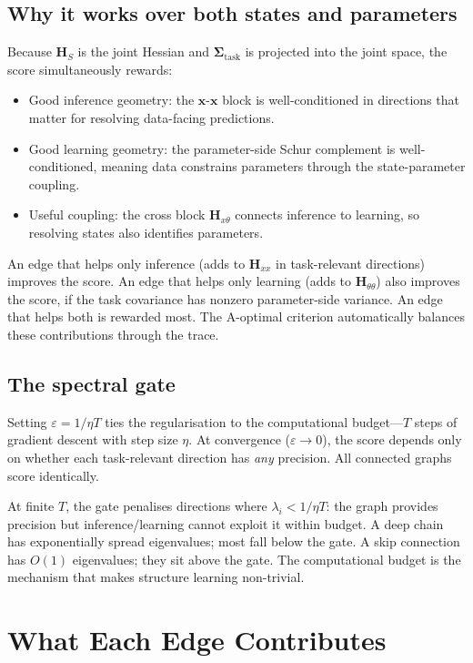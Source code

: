 \documentclass[11pt, a4paper]{article}
\newcommand{\bx}{\bm{x}}
\begin{document}
\subsection{Why it works over both states and parameters}

Because $\bm{H}_S$ is the joint Hessian and $\bm{\Sigma}_{\mathrm{task}}$ is projected into the joint space, the score simultaneously rewards:
\begin{itemize}
    \item Good inference geometry: the $\bx$-$\bx$ block is well-conditioned in directions that matter for resolving data-facing predictions.
    \item Good learning geometry: the parameter-side Schur complement is well-conditioned, meaning data constrains parameters through the state-parameter coupling.
    \item Useful coupling: the cross block $\bm{H}_{x\theta}$ connects inference to learning, so resolving states also identifies parameters.
\end{itemize}
An edge that helps only inference (adds to $\bm{H}_{xx}$ in task-relevant directions) improves the score.
An edge that helps only learning (adds to $\bm{H}_{\theta\theta}$) also improves the score, if the task covariance has nonzero parameter-side variance.
An edge that helps both is rewarded most.
The A-optimal criterion automatically balances these contributions through the trace.

\subsection{The spectral gate}

Setting $\varepsilon = 1/\eta T$ ties the regularisation to the computational budget---$T$ steps of gradient descent with step size $\eta$.
At convergence ($\varepsilon \to 0$), the score depends only on whether each task-relevant direction has \emph{any} precision.
All connected graphs score identically.

At finite $T$, the gate penalises directions where $\lambda_i < 1/\eta T$: the graph provides precision but inference/learning cannot exploit it within budget.
A deep chain has exponentially spread eigenvalues; most fall below the gate.
A skip connection has $O(1)$ eigenvalues; they sit above the gate.
The computational budget is the mechanism that makes structure learning non-trivial.

\section{What Each Edge Contributes}
\end{document}
